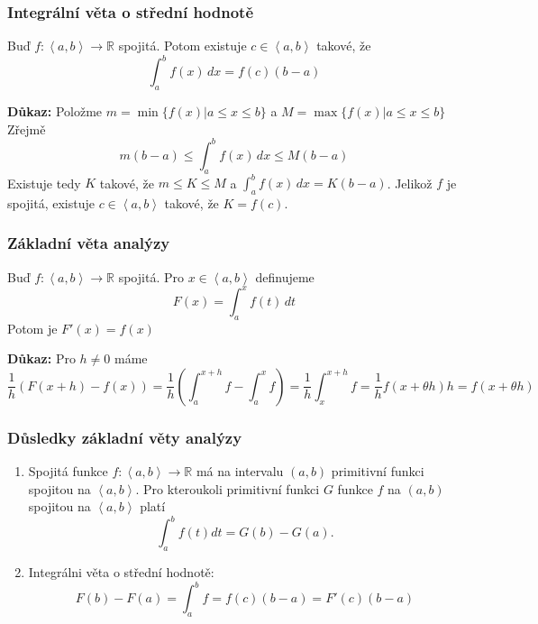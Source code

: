 \documentclass[10pt]{article}
\begin{document}
\subsubsection{Integrální věta o střední hodnotě}
\hspace{1.2mm}
Buď $f: \left< a,b \right> \to \mathbb{R}$ spojitá. Potom existuje $c \in \left< a,b \right>$
takové, že
\[ \int_{a}^{b} f(x) \,dx = f(c)(b-a)\]

\vspace{5mm}
\noindent
\textbf{Důkaz:} Položme $m = \min \{ f(x)|a \leq x \leq b \}$ a $M = \max \{ f(x)|a \leq x \leq b \} $
Zřejmě
\[ m(b-a) \leq \int_{a}^{b} f(x) \,dx \leq M(b-a) \]
Existuje tedy $K$ takové, že $m \leq K \leq M$ a $\int_{a}^{b} f(x) \,dx = K(b-a)$.
Jelikož $f$ je spojitá, existuje $c \in \left< a,b \right>$ takové, že $K = f(c)$.

\subsubsection{Základní věta analýzy}
\hspace{1.2mm}
Buď $f: \left< a,b \right> \to \mathbb{R}$ spojitá. Pro $x \in \left< a,b \right>$ definujeme
\[ F(x) = \int_{a}^{x} f(t) \,dt \]
Potom je $F'(x) = f(x)$

\vspace{5mm}
\noindent
\textbf{Důkaz:}
Pro $h\neq 0$ máme
\[ \frac{1}{h}(F(x+h) - f(x)) =\frac{1}{h}\left( \int_{a}^{x+h} f - \int_{a}^{x} f \right) =
\frac{1}{h} \int_{x}^{x+h} f = \frac{1}{h}f(x + \theta h)h = f(x + \theta h) \]

\subsubsection{Důsledky základní věty analýzy}
\hspace{1.2mm}
\begin{enumerate}
    \item Spojitá funkce $f : \left<a,b\right> \rightarrow \mathbb{R}$ má na intervalu $(a,b)$ primitivní funkci spojitou na $\left<a,b\right>$.
          Pro kteroukoli primitivní funkci $G$ funkce $f$ na $(a,b)$ spojitou na $\left<a,b\right>$ platí
          \[\int^b_a f(t)dt = G(b) - G(a).\]
    \item Integrálni věta o střední hodnotě:
    \[F(b) - F(a) = \int^b_a f = f(c)(b-a) = F'(c)(b-a)\]
\end{enumerate}
\noindent
\end{document}
